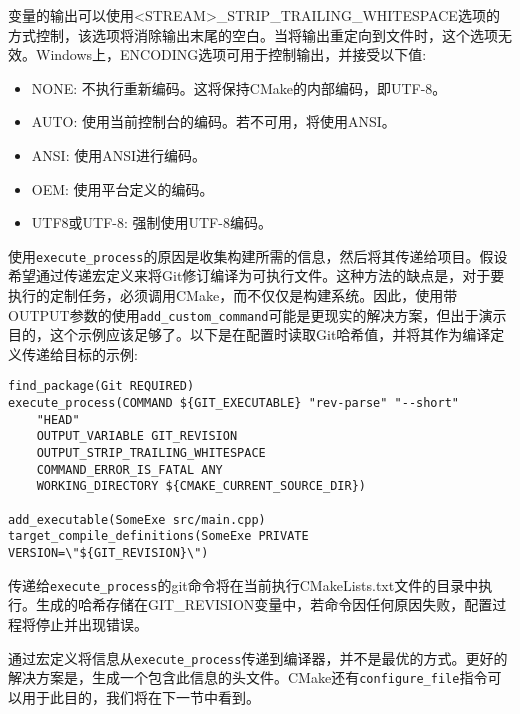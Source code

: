 变量的输出可以使用<STREAM>\_STRIP\_TRAILING\_WHITESPACE选项的方式控制，该选项将消除输出末尾的空白。当将输出重定向到文件时，这个选项无效。Windows上，ENCODING选项可用于控制输出，并接受以下值:

\begin{itemize}
\item 
NONE: 不执行重新编码。这将保持CMake的内部编码，即UTF-8。

\item 
AUTO: 使用当前控制台的编码。若不可用，将使用ANSI。

\item 
ANSI: 使用ANSI进行编码。

\item 
OEM: 使用平台定义的编码。

\item 
UTF8或UTF-8: 强制使用UTF-8编码。
\end{itemize}

使用\texttt{execute\_process}的原因是收集构建所需的信息，然后将其传递给项目。假设希望通过传递宏定义来将Git修订编译为可执行文件。这种方法的缺点是，对于要执行的定制任务，必须调用CMake，而不仅仅是构建系统。因此，使用带OUTPUT参数的使用\texttt{add\_custom\_command}可能是更现实的解决方案，但出于演示目的，这个示例应该足够了。以下是在配置时读取Git哈希值，并将其作为编译定义传递给目标的示例:

\begin{lstlisting}[style=styleCMake]
find_package(Git REQUIRED)
execute_process(COMMAND ${GIT_EXECUTABLE} "rev-parse" "--short"
	"HEAD"
	OUTPUT_VARIABLE GIT_REVISION
	OUTPUT_STRIP_TRAILING_WHITESPACE
	COMMAND_ERROR_IS_FATAL ANY
	WORKING_DIRECTORY ${CMAKE_CURRENT_SOURCE_DIR})

add_executable(SomeExe src/main.cpp)
target_compile_definitions(SomeExe PRIVATE VERSION=\"${GIT_REVISION}\")
\end{lstlisting}

传递给\texttt{execute\_process}的git命令将在当前执行CMakeLists.txt文件的目录中执行。生成的哈希存储在GIT\_REVISION变量中，若命令因任何原因失败，配置过程将停止并出现错误。

通过宏定义将信息从\texttt{execute\_process}传递到编译器，并不是最优的方式。更好的解决方案是，生成一个包含此信息的头文件。CMake还有\texttt{configure\_file}指令可以用于此目的，我们将在下一节中看到。

















